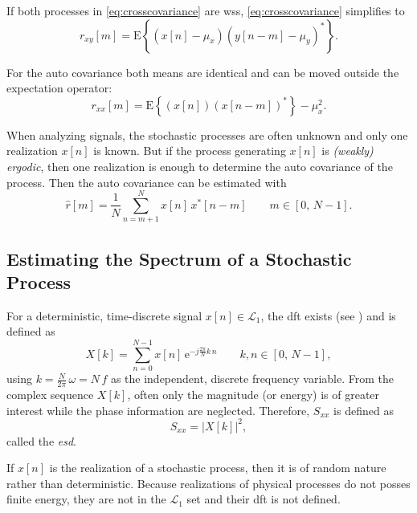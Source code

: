 If both processes in \autoref{eq:crosscovariance} are \gls{wss}, \autoref{eq:crosscovariance} simplifies to
\begin{equation}
r_{xy}[m] = \text{E}\left\{(x[n]-\mu_x)(y[n-m]-\mu_y)^\ast\right\}.
\end{equation}

For the auto covariance both means are identical and can be moved outside the expectation operator:
\begin{equation}
r_{xx}[m] = \text{E}\left\{(x[n])(x[n-m])^\ast\right\}-\mu_{x}^2.
\end{equation}

When analyzing signals, the stochastic processes are often unknown and only one realization $x[n]$ is known. But if the process generating $x[n]$ is \textit{(weakly) ergodic}, then one realization is enough to determine the auto covariance of the process. \cite[p.~252]{Puente2019}
Then the auto covariance can be estimated with
\begin{equation}\label{eq:autocovarianveEstimation}
\hat{r}[m] = \frac{1}{N} \sum_{n=m+1}^{N} x[n]\,x^\ast[n-m]\qquad m \in [0,\,N-1].
\end{equation} 


\subsection{Estimating the Spectrum of a Stochastic Process}
For a deterministic, time-discrete signal $x[n] \in \mathcal{L}_1$, the \gls{dft} exists (see \cite{Lapidoth2019}) and is defined as
\begin{equation}
X[k] = \sum_{n=0}^{N-1} x[n]\,\text{e}^{-j\frac{2\pi}{N}k\,n}\qquad k,n \in [0,\,N-1],
\end{equation}
using $k=\frac{N}{2\pi}\,\omega = N\,f$ as the independent, discrete frequency variable. 
From the complex sequence $X[k]$, often only the magnitude (or energy) is of greater interest while the phase information are neglected. 
Therefore, $S_{xx}$ is defined as
\begin{equation}
S_{xx} = \left|X[k]\right|^2,
\end{equation}
called the \textit{\gls{esd}}.

If $x[n]$ is the realization of a stochastic process, then it is of random nature rather than deterministic.
Because realizations of physical processes do not posses finite energy, they are not in the $\mathcal{L}_1$ set and their \gls{dft} is not defined. \cite[p.~5]{Stoica1997}


